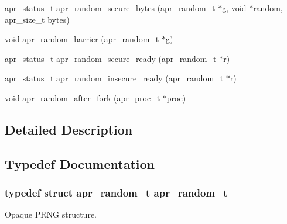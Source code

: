 \begin{DoxyCompactItemize}
\hyperlink{group__apr__errno_gaf76ee4543247e9fb3f3546203e590a6c}{apr\-\_\-status\-\_\-t} \hyperlink{group__apr__random_ga9f0607e06656a1c76cc5ee878fd94f09}{apr\-\_\-random\-\_\-secure\-\_\-bytes} (\hyperlink{group__apr__random_ga33073741e56b1bafe52ba58cefcbbf96}{apr\-\_\-random\-\_\-t} $\ast$g, void $\ast$random, apr\-\_\-size\-\_\-t bytes)
\item 
void \hyperlink{group__apr__random_ga37d8d7529cf972c605ebce97c57f8825}{apr\-\_\-random\-\_\-barrier} (\hyperlink{group__apr__random_ga33073741e56b1bafe52ba58cefcbbf96}{apr\-\_\-random\-\_\-t} $\ast$g)
\item 
\hyperlink{group__apr__errno_gaf76ee4543247e9fb3f3546203e590a6c}{apr\-\_\-status\-\_\-t} \hyperlink{group__apr__random_ga99d0c0722eeef2951e8ccede2e1451fa}{apr\-\_\-random\-\_\-secure\-\_\-ready} (\hyperlink{group__apr__random_ga33073741e56b1bafe52ba58cefcbbf96}{apr\-\_\-random\-\_\-t} $\ast$r)
\item 
\hyperlink{group__apr__errno_gaf76ee4543247e9fb3f3546203e590a6c}{apr\-\_\-status\-\_\-t} \hyperlink{group__apr__random_ga6465698bdc752d07abc8c515aac6e2c0}{apr\-\_\-random\-\_\-insecure\-\_\-ready} (\hyperlink{group__apr__random_ga33073741e56b1bafe52ba58cefcbbf96}{apr\-\_\-random\-\_\-t} $\ast$r)
\item 
void \hyperlink{group__apr__random_gaa1ab9b8adeeb6e37bb29def249ff9e6a}{apr\-\_\-random\-\_\-after\-\_\-fork} (\hyperlink{structapr__proc__t}{apr\-\_\-proc\-\_\-t} $\ast$proc)
\end{DoxyCompactItemize}


\subsection{Detailed Description}


\subsection{Typedef Documentation}
\hypertarget{group__apr__random_ga33073741e56b1bafe52ba58cefcbbf96}{
\subsubsection[{apr\-\_\-random\-\_\-t}]{\setlength{\rightskip}{0pt plus 5cm}typedef struct {\bf apr\-\_\-random\-\_\-t} {\bf apr\-\_\-random\-\_\-t}}}\label{group__apr__random_ga33073741e56b1bafe52ba58cefcbbf96}
Opaque P\-R\-N\-G structure. 

